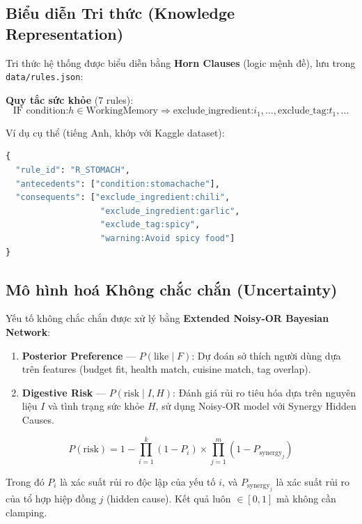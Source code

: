 \subsection{Biểu diễn Tri thức (Knowledge Representation)}

Tri thức hệ thống được biểu diễn bằng \textbf{Horn Clauses} (logic mệnh đề), lưu trong \texttt{data/rules.json}:

\textbf{Quy tắc sức khỏe} (7 rules):
\begin{equation}
  \text{IF condition:}h \in \text{WorkingMemory} \Rightarrow \text{exclude\_ingredient:}i_1, \ldots, \text{exclude\_tag:}t_1, \ldots
\end{equation}

Ví dụ cụ thể (tiếng Anh, khớp với Kaggle dataset):
\begin{lstlisting}[language=Python, caption=Horn Clause trong rules.json]
{
  "rule_id": "R_STOMACH",
  "antecedents": ["condition:stomachache"],
  "consequents": ["exclude_ingredient:chili",
                   "exclude_ingredient:garlic",
                   "exclude_tag:spicy",
                   "warning:Avoid spicy food"]
}
\end{lstlisting}

\subsection{Mô hình hoá Không chắc chắn (Uncertainty)}

Yếu tố không chắc chắn được xử lý bằng \textbf{Extended Noisy-OR Bayesian Network}:

\begin{enumerate}
  \item \textbf{Posterior Preference} --- $P(\text{like} \mid F)$: Dự đoán sở thích người dùng dựa trên features (budget fit, health match, cuisine match, tag overlap).

  \item \textbf{Digestive Risk} --- $P(\text{risk} \mid I, H)$: Đánh giá rủi ro tiêu hóa dựa trên nguyên liệu $I$ và tình trạng sức khỏe $H$, sử dụng Noisy-OR model với Synergy Hidden Causes.
\end{enumerate}

\begin{equation}
  P(\text{risk}) = 1 - \prod_{i=1}^{k}(1 - P_i) \times \prod_{j=1}^{m}(1 - P_{\text{synergy}_j})
\end{equation}

Trong đó $P_i$ là xác suất rủi ro độc lập của yếu tố $i$, và $P_{\text{synergy}_j}$ là xác suất rủi ro của tổ hợp hiệp đồng $j$ (hidden cause). Kết quả luôn $\in [0, 1]$ mà không cần clamping.

